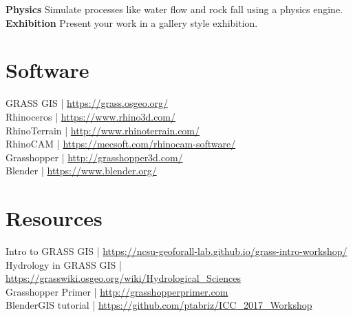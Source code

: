 \documentclass[11pt,article,oneside]{memoir}
\begin{document}
\noindent \textbf{Physics}
Simulate processes like water flow and rock fall
using a physics engine.\\

\noindent \textbf{Exhibition}
Present your work in a gallery style exhibition.\\


\section{Software}
GRASS GIS | \url{https://grass.osgeo.org/} \\
Rhinoceros | \url{https://www.rhino3d.com/}\\
RhinoTerrain | \url{http://www.rhinoterrain.com/}\\
RhinoCAM | \url{https://mecsoft.com/rhinocam-software/}\\
Grasshopper | \url{http://grasshopper3d.com/}\\
Blender | \url{https://www.blender.org/}\\

\section{Resources}
Intro to GRASS GIS | \url{https://ncsu-geoforall-lab.github.io/grass-intro-workshop/}\\
Hydrology in GRASS GIS | \url{https://grasswiki.osgeo.org/wiki/Hydrological_Sciences}\\
Grasshopper Primer | \url{http://grasshopperprimer.com}\\
BlenderGIS tutorial | \url{https://github.com/ptabriz/ICC_2017_Workshop}

\end{document}
